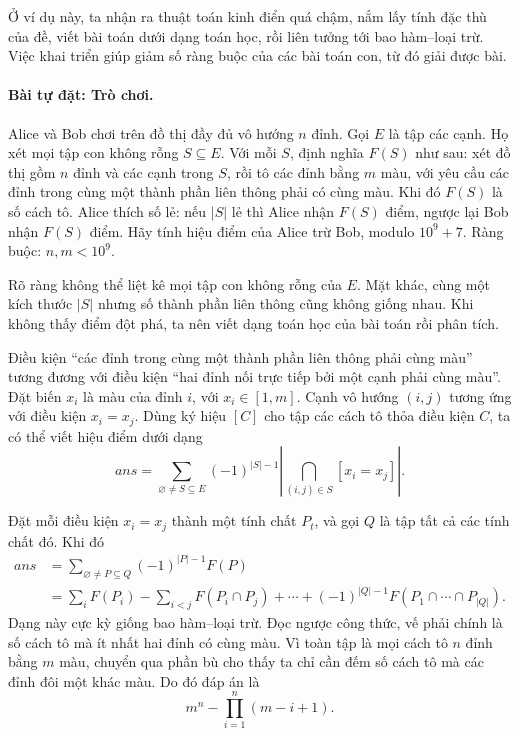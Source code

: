 \documentclass[11pt]{article}
\begin{document}
Ở ví dụ này, ta nhận ra thuật toán kinh điển quá chậm, nắm lấy tính đặc thù
của đề, viết bài toán dưới dạng toán học, rồi liên tưởng tới bao hàm--loại
trừ. Việc khai triển giúp giảm số ràng buộc của các bài toán con, từ đó giải
được bài.

\paragraph{Bài tự đặt: Trò chơi.}
Alice và Bob chơi trên đồ thị đầy đủ vô hướng \(n\) đỉnh. Gọi \(E\) là tập
các cạnh. Họ xét mọi tập con không rỗng \(S\subseteq E\). Với mỗi \(S\), định
nghĩa \(F(S)\) như sau: xét đồ thị gồm \(n\) đỉnh và các cạnh trong \(S\), rồi
tô các đỉnh bằng \(m\) màu, với yêu cầu các đỉnh trong cùng một thành phần
liên thông phải có cùng màu. Khi đó \(F(S)\) là số cách tô. Alice thích số lẻ:
nếu \(|S|\) lẻ thì Alice nhận \(F(S)\) điểm, ngược lại Bob nhận \(F(S)\) điểm.
Hãy tính hiệu điểm của Alice trừ Bob, modulo \(10^9+7\). Ràng buộc:
\(n,m<10^9\).

Rõ ràng không thể liệt kê mọi tập con không rỗng của \(E\). Mặt khác, cùng một
kích thước \(|S|\) nhưng số thành phần liên thông cũng không giống nhau. Khi
không thấy điểm đột phá, ta nên viết dạng toán học của bài toán rồi phân tích.

Điều kiện ``các đỉnh trong cùng một thành phần liên thông phải cùng màu'' tương
đương với điều kiện ``hai đỉnh nối trực tiếp bởi một cạnh phải cùng màu''. Đặt
biến \(x_i\) là màu của đỉnh \(i\), với \(x_i\in[1,m]\). Cạnh vô hướng
\((i,j)\) tương ứng với điều kiện \(x_i=x_j\). Dùng ký hiệu \([C]\) cho tập
các cách tô thỏa điều kiện \(C\), ta có thể viết hiệu điểm dưới dạng
\[
  \mathit{ans}
  = \sum_{\varnothing\ne S\subseteq E}(-1)^{|S|-1}
    \left|\bigcap_{(i,j)\in S}[x_i=x_j]\right|.
\]

Đặt mỗi điều kiện \(x_i=x_j\) thành một tính chất \(P_t\), và gọi \(Q\) là tập
tất cả các tính chất đó. Khi đó
\[
\begin{aligned}
\mathit{ans}
&=\sum_{\varnothing\ne P\subseteq Q}(-1)^{|P|-1}F(P)\\
&=\sum_i F(P_i)-\sum_{i<j}F(P_i\cap P_j)+\cdots
  +(-1)^{|Q|-1}F(P_1\cap\cdots\cap P_{|Q|}).
\end{aligned}
\]
Dạng này cực kỳ giống bao hàm--loại trừ. Đọc ngược công thức, vế phải chính là
số cách tô mà ít nhất hai đỉnh có cùng màu. Vì toàn tập là mọi cách tô \(n\)
đỉnh bằng \(m\) màu, chuyển qua phần bù cho thấy ta chỉ cần đếm số cách tô mà
các đỉnh đôi một khác màu. Do đó đáp án là
\[
  m^n-\prod_{i=1}^n(m-i+1).
\]
\end{document}
